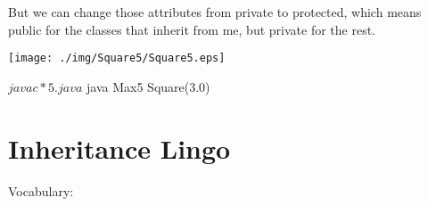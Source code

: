 \documentclass[a4paper, 9pt]{extarticle}
\begin{document}
But we can change those attributes from private to protected, which means
public for the classes that inherit from me, but private for the rest.

\begin{multicols}{2}
\columnbreak
  \begin{center}
    \texttt{[image: ./img/Square5/Square5.eps]}
  \end{center}
\end{multicols}

\begin{blackboard}
$ javac *5.java
$ java Max5
Square(3.0)
\end{blackboard}





\section{Inheritance Lingo}

Vocabulary:
\end{document}
